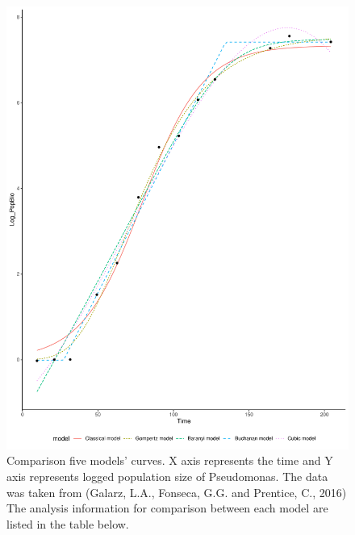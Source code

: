 \documentclass[11pt]{article}
\begin{document}
\begin{figure}[H]
    \centering
	\includegraphics[width = \textwidth]{../results/images/135_plot.pdf}
    \caption{Comparison five models’ curves. X axis represents the time and Y axis represents logged population size of Pseudomonas. The data was taken from (Galarz, L.A., Fonseca, G.G. and Prentice, C., 2016) The analysis information for comparison between each model are listed in the table below.}
    \label{fig5}
\end{figure}
\end{document}
